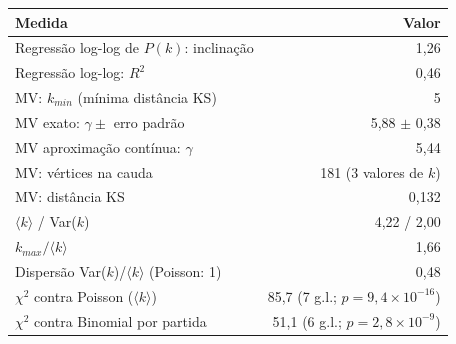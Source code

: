 \begin{tabular}{lr}
  \toprule
  Medida & Valor \\
  \midrule
  Regressão log-log de $P(k)$: inclinação & 1,26 \\
  Regressão log-log: $R^2$ & 0,46 \\
  MV: $k_{min}$ (mínima distância KS) & 5 \\
  MV exato: $\gamma \pm$ erro padrão & 5,88 $\pm$ 0,38 \\
  MV aproximação contínua: $\gamma$ & 5,44 \\
  MV: vértices na cauda & 181 (3 valores de $k$) \\
  MV: distância KS & 0,132 \\
  $\langle k \rangle$ / Var($k$) & 4,22 / 2,00 \\
  $k_{max} / \langle k \rangle$ & 1,66 \\
  Dispersão Var($k$)/$\langle k \rangle$ (Poisson: 1) & 0,48 \\
  $\chi^2$ contra Poisson ($\langle k \rangle$) & 85,7 (7 g.l.; $p = 9{,}4 \times 10^{-16}$) \\
  $\chi^2$ contra Binomial por partida & 51,1 (6 g.l.; $p = 2{,}8 \times 10^{-9}$) \\
  \bottomrule
\end{tabular}
